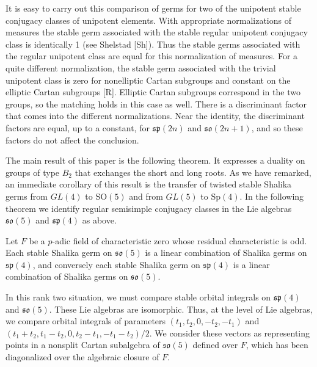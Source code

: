 \documentclass{amsart}
\newcommand\so{{\mathfrak s\mathfrak o}}
\newcommand\fsp{{\mathfrak s\mathfrak p}}
\newenvironment{cthm}[1]
  {\renewcommand\thethm{\bf #1}\thm}
  {\endthm}
\begin{document}
It is easy to carry out this comparison of germs
for two of the unipotent
stable conjugacy classes of unipotent elements.  With appropriate
normalizations of measures the stable germ associated with the stable
regular unipotent conjugacy class is identically 1  (see Shelstad [Sh]).
Thus the stable germs associated with the regular unipotent class
are equal for this normalization of measures.  For a quite
different normalization, the stable germ associated with 
the trivial unipotent class is zero for nonelliptic Cartan subgroups
and constant on the elliptic Cartan subgroups [R]. Elliptic Cartan subgroups
correspond in the two groups, so the matching holds in this case as
well.  There is a discriminant factor that comes into the different
normalizations.  Near the identity, 
the discriminant factors are
equal, up to a constant, for $\fsp(2n)$ and $\so(2n+1)$, and so these
factors do
not affect the conclusion.

The main result of this paper is the following theorem.  It expresses
a duality on groups of type $B_2$ that exchanges the short
and long roots.  As we have remarked, an immediate corollary of this
result is the transfer of twisted stable Shalika germs from $GL(4)$
to $\text{SO}(5)$ and from $GL(5)$ to $\text{Sp}(4)$.  In the following theorem
we identify regular semisimple conjugacy classes
in the Lie algebras $\so(5)$ and $\fsp(4)$
as above.

\bigskip
\noindent
\begin{cthm}{Theorem 1.1}   Let $F$ be a $p$-adic field of characteristic zero
whose residual characteristic is odd.  Each stable Shalika germ on $\so(5)$
is a linear combination of Shalika germs on $\fsp(4)$, and conversely each
stable Shalika germ on $\fsp(4)$ is a linear combination of Shalika germs
on $\so(5)$.
\end{cthm}

In this rank two situation,  we must compare stable orbital integrals
on $\fsp(4)$ and $\so(5)$. These Lie algebras are
isomorphic.  Thus, at the level of Lie algebras, we compare
orbital integrals of parameters $(t_1,t_2,0,-t_2,-t_1)$ and
$(t_1+t_2,t_1-t_2,0,t_2-t_1,-t_1-t_2)/2$.  We consider these vectors
as representing points in a nonsplit Cartan
subalgebra of $\so(5)$ defined over $F$, which has been
diagonalized over the algebraic closure of $F$.
\end{document}
